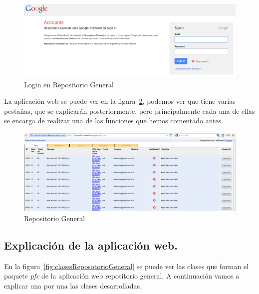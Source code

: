 \begin{figure}[h]
  \centering
    \includegraphics[scale=0.5]{./GoogleAppEngine/imagenes/login_repositorio_general.png}
  \caption{Login en Repositorio General}
  \label{fig:logueoRepoGeneral}
\end{figure}

La aplicación web se puede ver en la figura~\ref{fig:repositorio_general}, podemos ver que tiene varias pestañas, que se explicarán posteriormente, pero principalmente cada una de ellas se encarga de realizar una de las funciones que hemos comentado antes.

\begin{figure}[h]
  \centering
    \includegraphics[scale=0.4]{./GoogleAppEngine/imagenes/repositorio_general.png}
  \caption{Repositorio General}
  \label{fig:repositorio_general}
\end{figure}

\subsection{Explicación de la aplicación web.}

En la figura~\ref{fig:clasesReposotorioGeneral} se puede ver las clases que forman el paquete \textit{pfc} de la aplicación web repositorio general. A continuación vamos a explicar una por una las clases desarrolladas.

